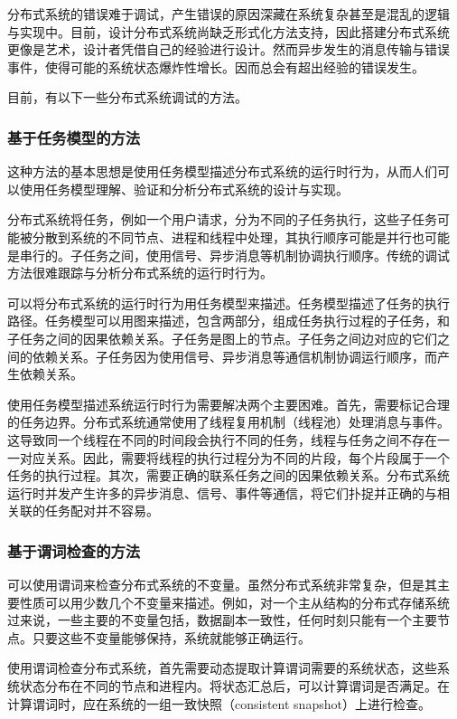 分布式系统的错误难于调试，产生错误的原因深藏在系统复杂甚至是混乱的逻辑
与实现中。目前，设计分布式系统尚缺乏形式化方法支持，因此搭建分布式系统
更像是艺术，设计者凭借自己的经验进行设计。然而异步发生的消息传输与错误
事件，使得可能的系统状态爆炸性增长。因而总会有超出经验的错误发生。

目前，有以下一些分布式系统调试的方法。

\subsubsection*{基于任务模型的方法}

这种方法的基本思想是使用任务模型描述分布式系统的运行时行为，从而人们可
以使用任务模型理解、验证和分析分布式系统的设计与实现。

分布式系统将任务，例如一个用户请求，分为不同的子任务执行，这些子任务可
能被分散到系统的不同节点、进程和线程中处理，其执行顺序可能是并行也可能
是串行的。子任务之间，使用信号、异步消息等机制协调执行顺序。传统的调试
方法很难跟踪与分析分布式系统的运行时行为。


可以将分布式系统的运行时行为用任务模型来描述。任务模型描述了任务的执行
路径。任务模型可以用图来描述，包含两部分，组成任务执行过程的子任务，和
子任务之间的因果依赖关系。子任务是图上的节点。子任务之间边对应的它们之
间的依赖关系。子任务因为使用信号、异步消息等通信机制协调运行顺序，而产
生依赖关系。

使用任务模型描述系统运行时行为需要解决两个主要困难。首先，需要标记合理
的任务边界。分布式系统通常使用了线程复用机制（线程池）处理消息与事件。
这导致同一个线程在不同的时间段会执行不同的任务，线程与任务之间不存在一
一对应关系。因此，需要将线程的执行过程分为不同的片段，每个片段属于一个
任务的执行过程。其次，需要正确的联系任务之间的因果依赖关系。分布式系统
运行时并发产生许多的异步消息、信号、事件等通信，将它们扑捉并正确的与相
关联的任务配对并不容易。

\subsubsection*{基于谓词检查的方法}

可以使用谓词来检查分布式系统的不变量。虽然分布式系统非常复杂，但是其主
要性质可以用少数几个不变量来描述。例如，对一个主从结构的分布式存储系统
过来说，一些主要的不变量包括，数据副本一致性，任何时刻只能有一个主要节
点。只要这些不变量能够保持，系统就能够正确运行。

使用谓词检查分布式系统，首先需要动态提取计算谓词需要的系统状态，这些系
统状态分布在不同的节点和进程内。将状态汇总后，可以计算谓词是否满足。在
计算谓词时，应在系统的一组一致快照（consistent snapshot）上进行检查。

